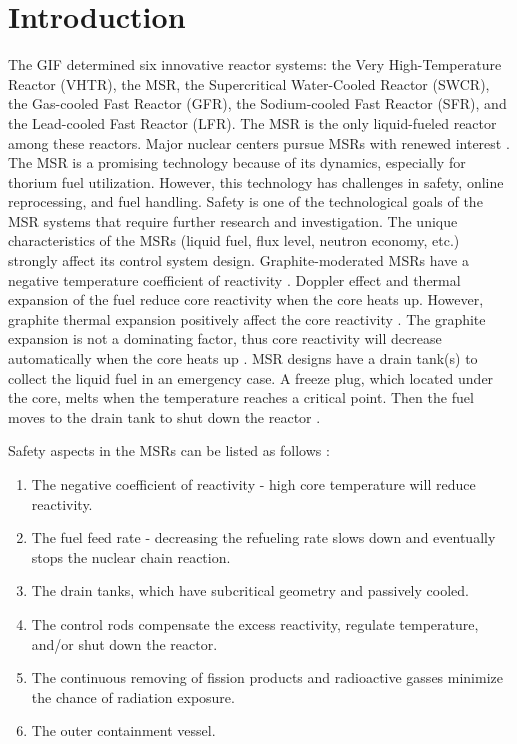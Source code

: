 \section{Introduction} \label{Introduction}

The \gls{GIF} \cite{doe2002technology} determined six innovative reactor systems: the Very High-Temperature Reactor (VHTR), the \gls{MSR}, the Supercritical Water-Cooled Reactor (SWCR), the Gas-cooled Fast Reactor (GFR), the Sodium-cooled Fast Reactor (SFR), and the Lead-cooled Fast Reactor (LFR). The MSR is the only liquid-fueled reactor among these reactors. Major nuclear centers pursue MSRs with renewed interest \cite{betzler_impacts_2019,ashraf2019whole_core,betzler2016modeling,mohsin2019safety,zhang2020radiotoxicity}. The MSR is a promising technology because of its dynamics, especially for thorium fuel utilization. However, this technology has challenges in safety, online reprocessing, and fuel handling. Safety is one of the technological goals of the MSR systems that require further research and investigation. The unique characteristics of the MSRs (liquid fuel, flux level, neutron economy, etc.) strongly affect its control system design. Graphite-moderated MSRs have a negative temperature coefficient of reactivity \cite{robertson_conceptual_1971,nuttin2005potential,rykhlevskii2019modeling,ashraf2019whole_core}. Doppler effect and thermal expansion of the fuel reduce core reactivity when the core heats up. However, graphite thermal expansion positively affect the core reactivity \cite{mathieu2006thorium}. The graphite expansion is not a dominating factor, thus core reactivity will decrease automatically when the core heats up \cite{li_optimization_2018}. MSR designs have a drain tank(s) to collect the liquid fuel in an emergency case. A freeze plug, which located under the core, melts when the temperature reaches a critical point. Then the fuel moves to the drain tank to shut down the reactor \cite{elsheikh2013safety}.

Safety aspects in the MSRs can be listed as follows \cite{elsheikh2013safety,merle2008optimization}:
\begin{enumerate}
\item The negative coefficient of reactivity - high core temperature will reduce reactivity.
\item The fuel feed rate - decreasing the refueling rate slows down and eventually stops the nuclear chain reaction.
\item The drain tanks, which have subcritical geometry and passively cooled.
\item The control rods compensate the excess reactivity, regulate temperature, and/or shut down the reactor.
\item The continuous removing of fission products and radioactive gasses minimize the chance of radiation exposure.
\item The outer containment vessel.
\end{enumerate}

